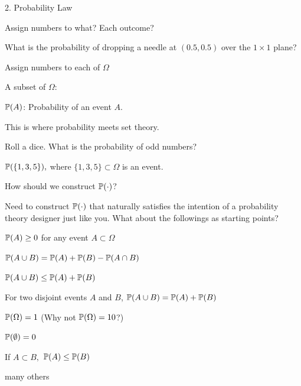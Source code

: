 \documentclass[fleqn,aspectratio=169]{beamer}
\begin{document}
\begin{frame}{2. Probability Law}

\plitemsep 0.1in

\bci [$\bullet$]

\item<2-> Assign numbers to what? Each outcome?

\item<3-> What is the probability of dropping a needle at $(0.5, 0.5)$ over the $1\times 1$ plane? 

\item<4-> Assign numbers to each  of $\Omega$

\item<6-> A subset of $\Omega$: 

\item<8-> $\mathbb{P}( A )$: Probability of an event $A.$

\bci
\item This is where probability meets set theory.  
\eci

\item<9-> Roll a dice. What is the probability of odd numbers?

\medskip
$
\mathbb{P}(  \{1,3,5 \} ),
$
where $\{1,3,5 \} \subset \Omega$ is an event.
\eci

\end{frame}

\begin{frame}{How should we construct $\mathbb{P}( \cdot )$?}

\plitemsep 0.1in

\bci [$\bullet$]

\item Need to construct $\mathbb{P}( \cdot )$ that naturally satisfies the intention of a probability theory designer just like you. What about the followings as starting points? 

\medskip

\bci
\item<2-> $\mathbb{P}( A ) \geq 0$ for any event $A \subset \Omega$

\item<3-> $\mathbb{P}( A \cup B ) = \mathbb{P}( A ) + \mathbb{P}( B ) - \mathbb{P}( A \cap B )$

\item<3-> $\mathbb{P}( A \cup B ) \leq  \mathbb{P}( A ) + \mathbb{P}( B )$ 

\item<3-> For two disjoint events $A$ and $B$, $\mathbb{P}( A \cup B ) = \mathbb{P}( A ) + \mathbb{P}( B )$

\item<4-> $\mathbb{P}( \Omega ) = 1$ (Why not $\mathbb{P}( \Omega ) = 10$?)

\item<4-> $\mathbb{P}( \emptyset ) = 0$

\item<5-> If $A \subset B,$ $\mathbb{P}( A ) \leq \mathbb{P}( B )$

\item<5-> many others
\eci
\eci

\end{frame}
\end{document}
